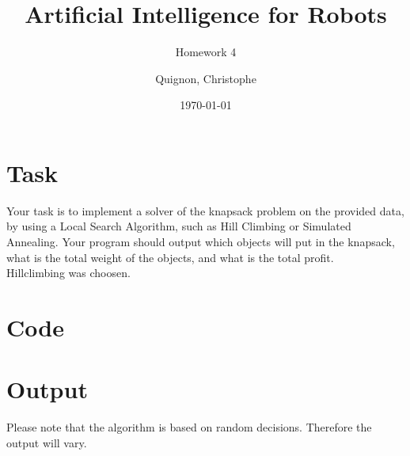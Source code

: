 \documentclass{scrartcl}
\begin{document}
\title{Artificial Intelligence for Robots}
\subtitle{Homework 4}
\author{
  Quignon, Christophe \\
} 
\date{\today}

\maketitle{}
\section{Task}Your task is to implement a solver of the knapsack problem on the provided data, by using a Local
Search Algorithm, such as Hill Climbing or Simulated Annealing. Your program should output which
objects will put in the knapsack, what is the total weight of the objects, and what is the total profit.
\\
Hillclimbing was choosen.
\newpage
\section{Code}


\newpage
\section{Output}
Please note that the algorithm is based on random decisions. Therefore the output will vary.

\end{document}
